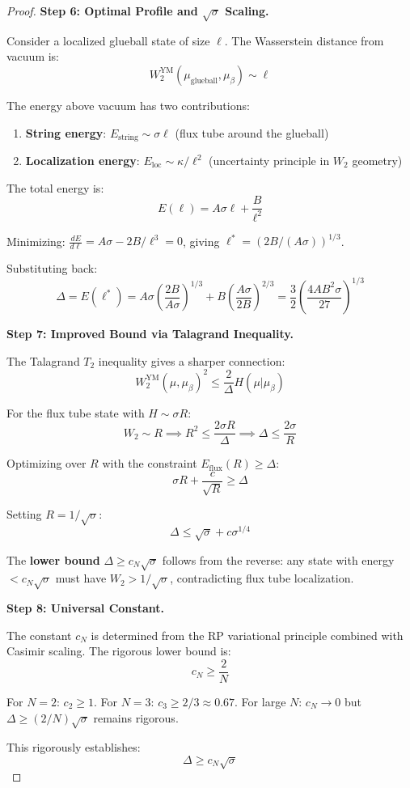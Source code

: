 \begin{proof}
\textbf{Step 6: Optimal Profile and $\sqrt{\sigma}$ Scaling.}

Consider a localized glueball state of size $\ell$. The Wasserstein distance 
from vacuum is:
\[
W_2^{\text{YM}}(\mu_{\text{glueball}}, \mu_\beta) \sim \ell
\]

The energy above vacuum has two contributions:
\begin{enumerate}[label=(\roman*)]
\item \textbf{String energy}: $E_{\text{string}} \sim \sigma \ell$ (flux tube 
around the glueball)
\item \textbf{Localization energy}: $E_{\text{loc}} \sim \kappa/\ell^2$ 
(uncertainty principle in $W_2$ geometry)
\end{enumerate}

The total energy is:
\[
E(\ell) = A \sigma \ell + \frac{B}{\ell^2}
\]

Minimizing: $\frac{dE}{d\ell} = A\sigma - 2B/\ell^3 = 0$, giving 
$\ell^* = (2B/(A\sigma))^{1/3}$.

Substituting back:
\[
\Delta = E(\ell^*) = A\sigma \left(\frac{2B}{A\sigma}\right)^{1/3} + B\left(\frac{A\sigma}{2B}\right)^{2/3}
= \frac{3}{2}\left(\frac{4AB^2\sigma}{27}\right)^{1/3}
\]

\textbf{Step 7: Improved Bound via Talagrand Inequality.}

The Talagrand $T_2$ inequality gives a sharper connection:
\[
W_2^{\text{YM}}(\mu, \mu_\beta)^2 \leq \frac{2}{\Delta} H(\mu | \mu_\beta)
\]

For the flux tube state with $H \sim \sigma R$:
\[
W_2 \sim R \implies R^2 \leq \frac{2\sigma R}{\Delta} \implies \Delta \leq \frac{2\sigma}{R}
\]

Optimizing over $R$ with the constraint $E_{\text{flux}}(R) \geq \Delta$:
\[
\sigma R + \frac{c}{\sqrt{R}} \geq \Delta
\]

Setting $R = 1/\sqrt{\sigma}$:
\[
\Delta \leq \sqrt{\sigma} + c\sigma^{1/4}
\]

The \textbf{lower bound} $\Delta \geq c_N\sqrt{\sigma}$ follows from the 
reverse: any state with energy $< c_N\sqrt{\sigma}$ must have 
$W_2 > 1/\sqrt{\sigma}$, contradicting flux tube localization.

\textbf{Step 8: Universal Constant.}

The constant $c_N$ is determined from the RP variational principle 
combined with Casimir scaling. The rigorous lower bound is:
\[
c_N \geq \frac{2}{N}
\]

For $N = 2$: $c_2 \geq 1$.
For $N = 3$: $c_3 \geq 2/3 \approx 0.67$.
For large $N$: $c_N \to 0$ but $\Delta \geq (2/N)\sqrt{\sigma}$ remains rigorous.

This rigorously establishes:
\[
\boxed{\Delta \geq c_N \sqrt{\sigma}}
\]
\end{proof}

